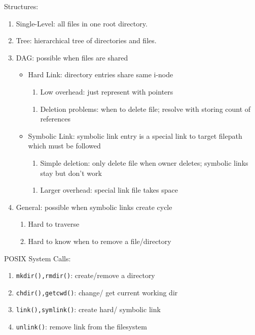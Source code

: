 \documentclass[12pt, a4paper]{article}
\begin{document}
\begin{multicols*}{3}
Structures:
\begin{enumerate}[\roman*.]
  \item Single-Level: all files in one root directory.
  \item Tree: hierarchical tree of directories and files.
  \item DAG: possible when files are shared \vspace{3pt}
    \begin{itemize}[leftmargin=*]
      \item Hard Link: directory entries share same i-node
        \begin{enumerate}[$+$]
          \item Low overhead: just represent with pointers 
        \end{enumerate}\vspace{3pt}
        \begin{enumerate}[$-$]
          \item Deletion problems: when to delete file; resolve with storing count of references
        \end{enumerate}
      \item Symbolic Link: symbolic link entry is a special link to target filepath which must be followed 
        \begin{enumerate}[$+$]
          \item Simple deletion: only delete file when owner deletes; symbolic links stay but don't work
        \end{enumerate}\vspace{3pt}
        \begin{enumerate}[$-$]
          \item Larger overhead: special link file takes space 
        \end{enumerate}
    \end{itemize}
  \item General: possible when symbolic links create cycle\vspace{1pt} 
    \begin{enumerate}[$-$]
      \item Hard to traverse 
      \item Hard to know when to remove a file/directory
    \end{enumerate}
\end{enumerate}

POSIX System Calls:
\begin{enumerate}[label=\roman*., leftmargin=*]
  \item \lstinline|mkdir(),rmdir()|: create/remove a directory
  \item \lstinline|chdir(),getcwd()|: change/ get current working dir
  \item \lstinline|link(),symlink()|: create hard/ symbolic link
  \item \lstinline|unlink()|: remove link from the filesystem 
\end{enumerate}
\vspace{-3pt}

\end{multicols*}
\end{document}
